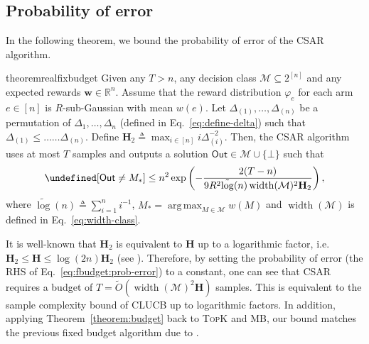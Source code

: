 \documentclass{article}
\newcommand{\Algorithm}{{\small \textsf{CLUCB}}\xspace}
\newcommand{\AlgorithmBud}{{\small \textsf{CSAR}}\xspace}
\newcommand{\Rew}{\varphi}
\newcommand{\M}{\mathcal M}
\newcommand{\RR}{\mathbb R}
\DeclareMathOperator{\rank}{width}
\DeclareMathOperator*{\argmax}{arg\,max}
\newcommand{\out}{\mathsf{Out}}
\newcommand{\barlog}{\tilde{\log}}
\let\Pr\undefined
\DeclareMathOperator{\Pr}{Pr}
\newcommand{\MultiIdent}{\textsc{TopK}\xspace}
\newcommand{\MultiBandit}{\textsc{MB}\xspace}
\renewcommand{\vec}[1]{\boldsymbol{#1}}
\begin{document}
\subsection{Probability of error}
\vspace{-0.5em}
In the following theorem, we bound the probability of error of the \AlgorithmBud algorithm.
\begin{restatable}{theorem}{realfixbudget}
Given any $T>n$, any decision class $\M \subseteq 2^{[n]}$ and any expected rewards $\vec w \in \RR^{n}$.
Assume that the reward distribution $\Rew_e$ for each arm $e\in [n]$ is  $R$-sub-Gaussian with mean $w(e)$.
Let $\Delta_{(1)},\ldots,\Delta_{(n)}$ be a permutation of $\Delta_1,\ldots,\Delta_n$ (defined in Eq.~\eqref{eq:define-delta}) such that
$\Delta_{(1)} \le \ldots \ldots \Delta_{(n)}$. 
Define $\mathbf H_2 \triangleq \max_{i\in[n]} i\Delta_{(i)}^{-2}$.
Then, the \AlgorithmBud algorithm uses at most $T$ samples and outputs a solution $\out \in \M \cup \{\bot\}$ such that
\begin{equation}
\Pr[\out\not=M_*] \le n^2  \exp\left(-\frac{2(T-n)}{9R^2 \barlog(n) \rank(\M)^2 \mathbf H_2} \right),
\label{eq:fbudget:prob-error}
\end{equation}
where $\barlog(n)\triangleq \sum_{i=1}^n i^{-1}$, $M_* = \argmax_{M\in \M} w(M)$ and $\rank(\M)$ is defined in Eq.~\eqref{eq:width-class}.
\label{theorem:budget}
\end{restatable}
It is well-known that $\mathbf H_2$ is equivalent to $\mathbf H$ up to a logarithmic factor, i.e. $\mathbf H_2 \le \mathbf H \le \log(2n) \mathbf H_2$ (see \citep{audibert2010best}).
Therefore, by setting the probability of error (the RHS of Eq.~\eqref{eq:fbudget:prob-error}) to a constant, one can see that \AlgorithmBud requires a budget of $T = \tilde O(\rank(\M)^2 \mathbf H)$ samples.
This is equivalent to the sample complexity bound of \Algorithm up to logarithmic factors.
In addition, applying Theorem~\ref{theorem:budget} back to \MultiIdent and \MultiBandit, our bound matches the previous fixed budget algorithm due to \citet{bubeck2013multiple}.
\end{document}
